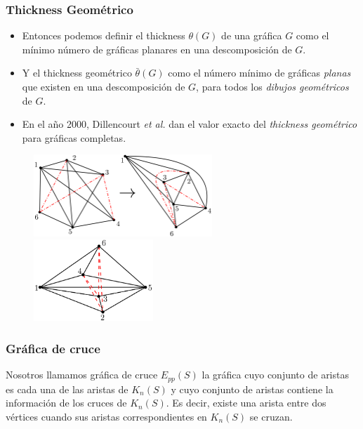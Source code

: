 \begin{frame}\frametitle{Thickness Geométrico}
	\begin{itemize}
		\item[] Entonces podemos definir el thickness $\theta(G)$ de una gráfica $G$ como el mínimo número de gráficas planares en una descomposición de $G$. 
		
		\item[] Y el thickness geométrico $\bar{\theta}(G)$ como el número mínimo de gráficas \emph{planas} que existen en una descomposición de $G$, para todos los \emph{dibujos geométricos} de $G$.
		
		\item[] En el año 2000, Dillencourt \emph{et al.} dan el valor exacto del \emph{thickness geométrico} para gráficas completas.\\[5pt]
	\end{itemize}
	
\end{frame}
\begin{frame}
	\begin{figure}
		\centering
		\includegraphics[width=0.6\textwidth]{images/K6_thicknes2}%
		~\vrule
		\includegraphics[width=0.4\textwidth]{images/K6_gthicknes2}
	\end{figure}
\end{frame}

\begin{frame}\frametitle{Gráfica de cruce}
Nosotros llamamos gráfica de cruce $E_{pp}(S)$ la gráfica cuyo conjunto de aristas es cada una de las aristas de $K_n(S)$ y cuyo conjunto de aristas contiene la información de los cruces de $K_n(S)$. Es decir, existe una arista entre dos vértices cuando sus aristas correspondientes en $K_n(S)$ se cruzan.
\end{frame}


